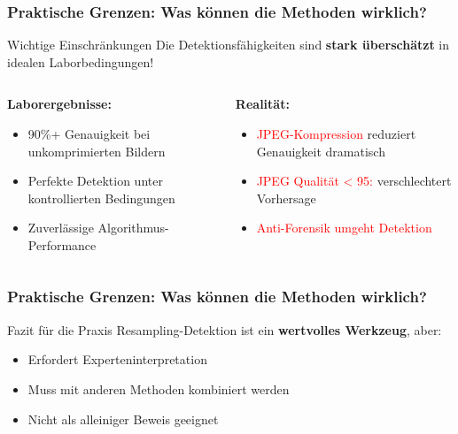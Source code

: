 \documentclass[11pt,t,usepdftitle=false,aspectratio=169]{beamer}
\begin{document}
\begin{frame}
	\frametitle{Praktische Grenzen: Was können die Methoden wirklich?}
	
	\begin{alertblock}{Wichtige Einschränkungen}
		Die Detektionsfähigkeiten sind \textbf{stark überschätzt} in idealen Laborbedingungen!
	\end{alertblock}
	
	\vspace{0.5em}
	
	\begin{columns}[T]
		\begin{column}{0.48\textwidth}
			\textbf{Laborergebnisse:}
			\begin{itemize}
				\item 90\%+ Genauigkeit bei unkomprimierten Bildern
				\item Perfekte Detektion unter kontrollierten Bedingungen
				\item Zuverlässige Algorithmus-Performance
			\end{itemize}
		\end{column}
		
		\begin{column}{0.48\textwidth}
			\textbf{Realität:}
			\begin{itemize}
				\item \textcolor{red}{JPEG-Kompression} reduziert Genauigkeit dramatisch~\cite{luo_upscaling_2021}
				\item \textcolor{red}{JPEG Qualität < 95:} verschlechtert Vorhersage
				\item \textcolor{red}{Anti-Forensik umgeht Detektion}~\cite{kirchner_hiding_2008}
			\end{itemize}
		\end{column}
	\end{columns}

\end{frame}

\begin{frame}
	\frametitle{Praktische Grenzen: Was können die Methoden wirklich?}
	\begin{exampleblock}{Fazit für die Praxis}
		Resampling-Detektion ist ein \textbf{wertvolles Werkzeug}, aber:
		\begin{itemize}
			\item Erfordert Experteninterpretation
			\item Muss mit anderen Methoden kombiniert werden  
			\item Nicht als alleiniger Beweis geeignet
		\end{itemize}
	\end{exampleblock}
\end{frame}
\end{document}
